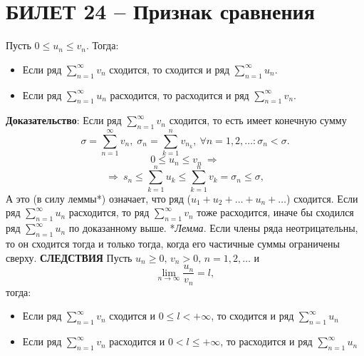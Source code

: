 \documentclass{article}
\begin{document}
\section{БИЛЕТ 24 -- Признак сравнения}
Пусть $0\leqslant u_{n}\leqslant v_{n}$. Тогда:
\begin{itemize}
    \item Если ряд $ \sum_{n=1}^{\infty}v_{n} $ сходится, то сходится и ряд $ \sum_{n=1}^{\infty}u_{n} $.
    \item Если ряд $ \sum_{n=1}^{\infty}u_{n} $ расходится, то расходится и ряд $ \sum_{n=1}^{\infty}v_{n} $.
\end{itemize}
\textbf{Доказательство}:
\newline
\newline
Если ряд $ \sum_{n=1}^{\infty}v_{n} $
сходится, то есть имеет конечную сумму 
$$ \sigma=\sum_{n=1}^{\infty} v_{n},\; \sigma_{n}=\sum_{k=1}^{n} v_{n_{k}},\: \forall n=1,2,\ldots :\sigma_{n}<\sigma.$$
$$ 0\leqslant u_{n}\leqslant v_{n}\:\Rightarrow $$
$$ \Rightarrow\:s_{n}\leqslant \sum_{k=1}^{n} u_{k}\leqslant\sum_{k=1}^{n} v_{k}=\sigma_{n}\leqslant\sigma,$$
А это (в силу леммы*) означает, что ряд ($u_{1}+u_{2}+\ldots+u_{n}+\ldots$) сходится.
\newline
\newline
Если ряд $ \sum_{n=1}^{\infty}u_{n} $ расходится, то ряд $ \sum_{n=1}^{\infty}v_{n} $ тоже расходится, иначе бы сходился ряд $ \sum_{n=1}^{\infty}u_{n} $ по доказанному выше.
\newline
\newline
*\textit{Лемма}. Если члены ряда неотрицательны, то он сходится тогда и только тогда, когда его частичные суммы ограничены сверху.
\newline
\newline
\textbf{СЛЕДСТВИЯ}
\newline
\newline
Пусть $u_{n}\geqslant0,\,v_{n}>0,\,n=1,2,\ldots$ и
$$ \lim_{n\to\infty}\frac{u_{n}}{v_{n}}=l, $$
тогда:
\begin{itemize}
    \item Если ряд $ \sum_{n=1}^{\infty}v_{n} $ сходится и $0\leqslant l<+\infty$, то сходится и ряд $ \sum_{n=1}^{\infty}u_{n} $
    \item Если ряд $ \sum_{n=1}^{\infty}v_{n} $ расходится и $0<l\leqslant+\infty$, то расходится и ряд $ \sum_{n=1}^{\infty}u_{n} $
\end{itemize}
\newpage
\end{document}

